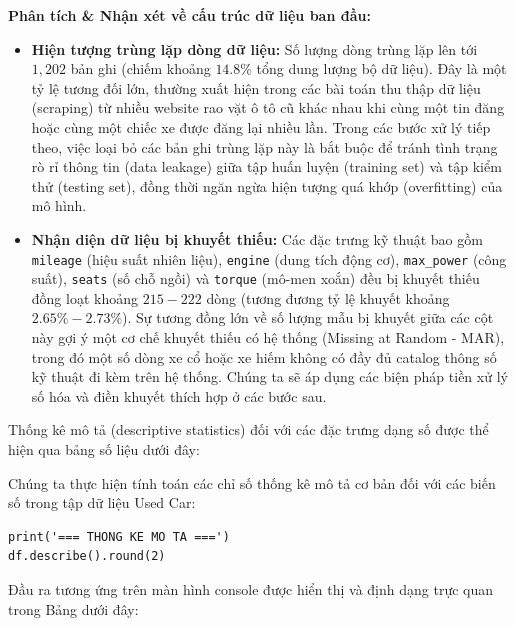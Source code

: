 \textbf{Phân tích \& Nhận xét về cấu trúc dữ liệu ban đầu:}
\begin{itemize}
    \item \textbf{Hiện tượng trùng lặp dòng dữ liệu:} Số lượng dòng trùng lặp lên tới $1,202$ bản ghi (chiếm khoảng $14.8\%$ tổng dung lượng bộ dữ liệu). Đây là một tỷ lệ tương đối lớn, thường xuất hiện trong các bài toán thu thập dữ liệu (scraping) từ nhiều website rao vặt ô tô cũ khác nhau khi cùng một tin đăng hoặc cùng một chiếc xe được đăng lại nhiều lần. Trong các bước xử lý tiếp theo, việc loại bỏ các bản ghi trùng lặp này là bắt buộc để tránh tình trạng rò rỉ thông tin (data leakage) giữa tập huấn luyện (training set) và tập kiểm thử (testing set), đồng thời ngăn ngừa hiện tượng quá khớp (overfitting) của mô hình.
    \item \textbf{Nhận diện dữ liệu bị khuyết thiếu:} Các đặc trưng kỹ thuật bao gồm \texttt{mileage} (hiệu suất nhiên liệu), \texttt{engine} (dung tích động cơ), \texttt{max\_power} (công suất), \texttt{seats} (số chỗ ngồi) và \texttt{torque} (mô-men xoắn) đều bị khuyết thiếu đồng loạt khoảng $215 - 222$ dòng (tương đương tỷ lệ khuyết khoảng $2.65\% - 2.73\%$). Sự tương đồng lớn về số lượng mẫu bị khuyết giữa các cột này gợi ý một cơ chế khuyết thiếu có hệ thống (Missing at Random - MAR), trong đó một số dòng xe cổ hoặc xe hiếm không có đầy đủ catalog thông số kỹ thuật đi kèm trên hệ thống. Chúng ta sẽ áp dụng các biện pháp tiền xử lý số hóa và điền khuyết thích hợp ở các bước sau.
\end{itemize}

Thống kê mô tả (descriptive statistics) đối với các đặc trưng dạng số được thể hiện qua bảng số liệu dưới đây:

Chúng ta thực hiện tính toán các chỉ số thống kê mô tả cơ bản đối với các biến số trong tập dữ liệu Used Car:

\begin{lstlisting}[style=pythoncode, caption={Tính toán thống kê mô tả cơ bản}]
print('=== THONG KE MO TA ===')
df.describe().round(2)
\end{lstlisting}

Đầu ra tương ứng trên màn hình console được hiển thị và định dạng trực quan trong Bảng dưới đây:

